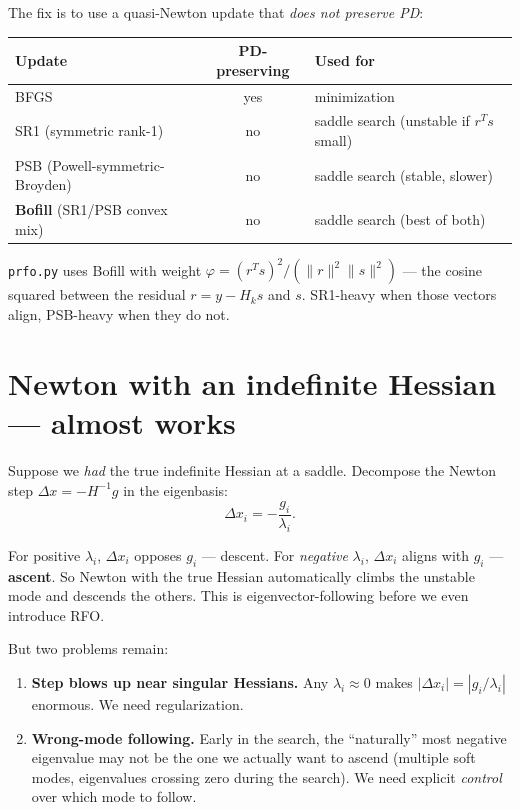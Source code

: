 \documentclass[11pt]{article}
\newcommand{\dx}{\Delta x}
\begin{document}
The fix is to use a quasi-Newton update that \emph{does not preserve PD}:

\begin{center}
\begin{tabular}{l c l}
\hline
Update & PD-preserving & Used for \\
\hline
BFGS & yes & minimization \\
SR1 (symmetric rank-1) & no & saddle search (unstable if $r^T s$ small) \\
PSB (Powell-symmetric-Broyden) & no & saddle search (stable, slower) \\
\textbf{Bofill} (SR1/PSB convex mix) & no & saddle search (best of both) \\
\hline
\end{tabular}
\end{center}

\noindent \texttt{prfo.py} uses Bofill with weight
$\varphi = (r^T s)^2 / (\|r\|^2 \|s\|^2)$ --- the cosine squared between the
residual $r = y - H_k s$ and $s$.  SR1-heavy when those vectors align,
PSB-heavy when they do not.

\section{Newton with an indefinite Hessian --- almost works}

Suppose we \emph{had} the true indefinite Hessian at a saddle.  Decompose the
Newton step $\dx = -H^{-1} g$ in the eigenbasis:
\begin{equation*}
  \dx_i = -\frac{g_i}{\lambda_i}.
\end{equation*}

For positive $\lambda_i$, $\dx_i$ opposes $g_i$ --- descent.  For
\emph{negative} $\lambda_i$, $\dx_i$ aligns with $g_i$ --- \textbf{ascent}.
So Newton with the true Hessian automatically climbs the unstable mode and
descends the others.  This is eigenvector-following before we even introduce
RFO.

But two problems remain:
\begin{enumerate}
  \item \textbf{Step blows up near singular Hessians.}  Any $\lambda_i \approx 0$
        makes $|\dx_i| = |g_i / \lambda_i|$ enormous.  We need regularization.
  \item \textbf{Wrong-mode following.}  Early in the search, the ``naturally''
        most negative eigenvalue may not be the one we actually want to ascend
        (multiple soft modes, eigenvalues crossing zero during the search).
        We need explicit \emph{control} over which mode to follow.
\end{enumerate}
\end{document}

